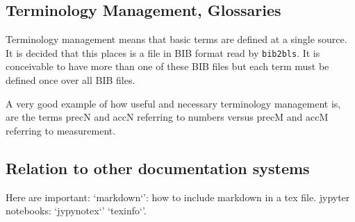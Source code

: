 \documentclass[a4paper,12pt]{article}
\begin{document}
\subsection{Terminology Management, Glossaries}\label{subsec:glos}

Terminology management means that basic terms are defined at a single source. 
It is decided that this places is a file in BIB format read by \texttt{bib2bls}. 
It is conceivable to have more than one of these BIB files 
but each term must be defined once over all BIB files. 

A very good example of how useful and necessary terminology management is, 
are the terms \gls{precN} and \gls{accN} referring to numbers 
versus \gls{precM} and \gls{accM} referring to measurement. 

\subsection{Relation to other documentation systems}

Here are important: 
`markdown`': how to include markdown in a tex file. 
jypyter notebooks: `jypynotex`'
`texinfo`'. 



\printunsrtglossaries%

\end{document}
